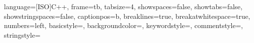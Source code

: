 \usepackage{amsmath}
\usepackage{amsfonts}
\usepackage{amsthm}
\usepackage{amssymb}
\usepackage{mathtools}
\usepackage{bm}
\newcommand{\uvec}[1]{\boldsymbol{\hat{\textbf{#1}}}}

\DeclarePairedDelimiter{\ceil}{\lceil}{\rceil}
\DeclarePairedDelimiter{\floor}{\lfloor}{\rfloor}
\DeclarePairedDelimiter{\bag}{\langle}{\rangle}
\DeclarePairedDelimiter{\set}{\{}{\}}

\usepackage{marginnote}
\usepackage[shortlabels]{enumitem}

\usepackage{lastpage}
\usepackage{fancyhdr}
\setlength{\headheight}{24pt}
\usepackage{eurosym}
\pagestyle{fancy}

\usepackage[nameinlink]{cleveref}

\title{\doctitle}
\author{\docauthor}
\date{\today}

\lhead{\doctitleshort}
\rhead{\today}
\cfoot{\thepage\ /~\pageref{LastPage}}


\usepackage{changepage}



 {
    language=[ISO]C++,
    frame=tb,
    tabsize=4,
    showspaces=false,
    showtabs=false,
    showstringspaces=false,
    captionpos=b,
    breaklines=true,
    breakatwhitespace=true,
    numbers=left,
    basicstyle=\scriptsize\ttfamily,
    backgroundcolor=\color{back-color},
    keywordstyle=\color{keywords},
    commentstyle=\color{comments},
    stringstyle=\color{strings}
}
\lstset{style=c++}


\doctitlepage{}


\clearpage
\setcounter{page}{1}
\newpage


\newpage


